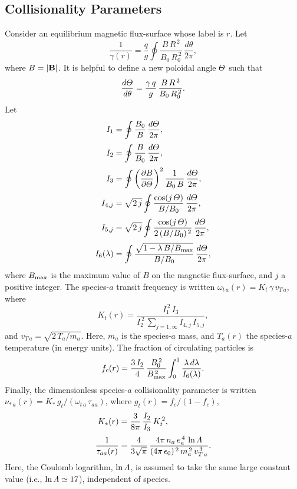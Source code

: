 \documentclass[notitlepage,12pt]{article}
\begin{document}
\subsection{Collisionality Parameters}
Consider an equilibrium magnetic flux-surface whose label is $r$. 
Let
\begin{equation}
\frac{1}{\gamma(r)} =\frac{q}{g}\oint\frac{ B\,R^{\,2}}{B_0\,R_0^{\,2}}\,\frac{d\theta}{2\pi},
\end{equation}
where $B=|{\bf B}|$. 
It is helpful to define a new poloidal angle ${\mit\Theta}$ such that
\begin{equation}
\frac{d{\mit\Theta}}{d\theta} = \frac{\gamma\,q}{g}\,\frac{B\,R^{\,2}}{B_0\,R_0^{\,2}}.
\end{equation}
Let
\begin{align}
I_1 &=\oint \frac{B_0}{B}\,\frac{d{\mit\Theta}}{2\pi},\\[0.5ex]
I_2 &=\oint \frac{B}{B_0}\,\frac{d{\mit\Theta}}{2\pi},\\[0.5ex]
I_3 &=\oint\left(\frac{\partial B}{\partial{\mit\Theta}}\right)^2\frac{1}{B_0\,B}\,\frac{d{\mit\Theta}}{2\pi},\\[0.5ex]
I_{4,j}&= \sqrt{2\,j}\oint\frac{\cos(j\,{\mit\Theta})}{B/B_0}\,\frac{d{\mit\Theta}}{2\pi},\\[0.5ex]
I_{5,j} &= \sqrt{2\,j}\oint\frac{\cos(j\,{\mit\Theta})}{2\,(B/B_0)^{\,2}}\,\frac{d{\mit\Theta}}{2\pi},\\[0.5ex]
I_6(\lambda) &=\oint \frac{\sqrt{1-\lambda\,B/B_{\rm max}}}{B/B_0}\,\frac{d{\mit\Theta}}{2\pi},
\end{align}
where $B_{\rm max}$ is the maximum value of $B$ on the magnetic
flux-surface, and $j$ a positive integer. 
The species-$a$ transit frequency is written
$\omega_{t\,a}(r)= K_t\,\gamma\,v_{T\,a}$,
where 
\begin{equation}\label{cdef}
K_t(r) = \frac{I_1^{\,2}\,I_3}{I_2^{\,2}\,\sum_{j=1,\infty} I_{4,j}\,I_{5,j}},
\end{equation}
and $v_{T\,a} = \sqrt{2\,T_a/m_a}$.  Here, $m_a$ is the
species-$a$ mass, and $T_a(r)$ the species-$a$ temperature (in energy units). The fraction of circulating particles 
is
\begin{equation}
f_c(r) = \frac{3\,I_2}{4}\,\frac{B_0^{\,2}}{B_{\rm max}^{\,2}}
\int_0^1 \frac{\lambda\,d\lambda}{I_6(\lambda)}.
\end{equation}
Finally, the dimensionless species-$a$ collisionality parameter
is written
$\nu_{\ast\,a} (r)= K_\ast\,g_t/(\omega_{t\,a}\,\tau_{aa})$,
where 
$g_t(r) =f_c/(1-f_c)$,
\begin{align}
K_\ast(r) &= \frac{3}{8\pi}\,\frac{I_2}{I_3}\,K_t^{\,2},\\[0.5ex]
\frac{1}{\tau_{aa}(r)}&= \frac{4}{3\sqrt{\pi}}\,\frac{4\pi\,n_a\,e_a^{\,4}\,\ln{\mit\Lambda}}{(4\pi\,\epsilon_0)^{\,2}\,m_a^{\,2}\,v_{T\,a}^{\,3}}.
\end{align}
Here, the Coulomb logarithm, $\ln{\mit\Lambda}$, is assumed to take the same large constant value (i.e., $\ln{\mit\Lambda}\simeq 17$), 
independent of species. 
\end{document}
